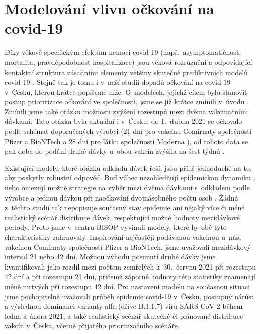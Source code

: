 \section*{Modelování vlivu očkování na covid-19}

Díky věkově specifickým efektům nemoci covid-19 (např.\ asymptomatičnost, mortalita, pravděpodobnost hospitalizace) jsou věková rozrůznění a odpovídající kontaktní struktura zásadními elementy většiny skutečně prediktivních modelů covid-19 \cite[a mnoho dalších]{Davies_etal2020,Bubar_etal2021,Moore_etal2021,Rozhnova_etal2021}. Stejně tak je tomu i v~naší studii dopadů očkování na covid-19 v~Česku, kterou krátce popíšeme níže. O~modelech, jejichž cílem bylo stanovit postup prioritizace očkování ve společnosti, jsme se již krátce zmínili v~úvodu \cite{Bubar_etal2021,Moore_etal2021b}. Zmínili jsme také otázku možnosti zvýšení rozestupů mezi dvěma vakcinačními dávkami. Tato otázka byla aktuální i v~Česku: do 1.\ dubna 2021 se očkovalo podle schémat doporučených výrobci (21 dní pro vakcínu Comirnaty společností Pfizer a BioNTech a 28 dní pro látku společnosti Moderna \cite{original_delay}), od tohoto data se pak doba do podání druhé dávky u~obou vakcín zvýšila na šest týdnů \cite{covidportalspec}.

Existující modely, které otázku odkladu dávek řeší, jsou příliš jednoduché na to, aby poskytly robustní odpověď. Buď vůbec nezohledňují epidemickou dynamiku \cite{Tuite_etal2021}, nebo omezují možné strategie na výběr mezi dvěma dávkami s~odkladem podle výrobce a jednou dávkou při naočkování dvojnásobného počtu osob \cite{Paltiel_etal2021}. Žádná z~těchto studií tak nepopisuje současný stav epidemie ani nějaký více či méně realistický scénář distribuce dávek, respektující možné hodnoty mezidávkové periody. Proto jsme v~centru BISOP vyvinuli modely, které by obě tyto charakteristiky zahrnovaly. Inspirováni nejčastěji podávanou vakcínou u~nás, vakcínou Comirnaty společností Pfizer a BioNTech, jsme uvažovali mezidávkový interval 21 nebo 42 dní. Možnou výhodu posunutí druhé dávky jsme kvantifikovali jako rozdíl mezi počtem zemřelých k~30.\ červnu 2021 při rozestupu 42 dní a při rozestupu 21 dní, přičemž záporné hodnoty této statistiky znamenají méně mrtvých při rozestupu 42 dní. Pro nastavení modelu na současnou situaci jsme pochopitelně uvažovali průběh epidemie covid-19 v~Česku, postupný nárůst a výslednou dominanci varianty alfa (dříve B.1.1.7) viru SARS-CoV-2 během ledna a února 2021, a také realistický scénář skutečné či plánované distribuce vakcín v~Česku, včetně přijatého prioritizačního scénáře. 

